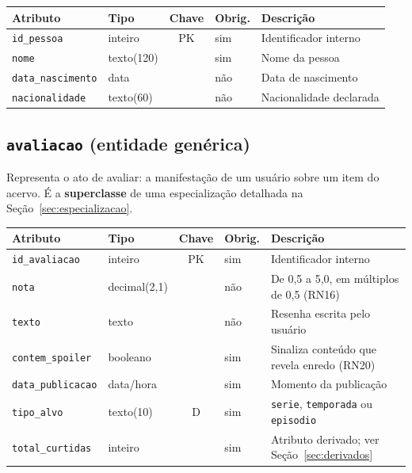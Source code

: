 \documentclass[a4paper,12pt,oneside,openany]{book}
\newcommand{\id}[1]{\texttt{#1}}
\begin{document}
\begin{table}[H]
\centering
\small
\begin{tabularx}{\textwidth}{@{}llclX@{}}
\toprule
\textbf{Atributo} & \textbf{Tipo} & \textbf{Chave} & \textbf{Obrig.} & \textbf{Descrição} \\
\midrule
\id{id\_pessoa} & inteiro & PK & sim & Identificador interno \\
\id{nome} & texto(120) & & sim & Nome da pessoa \\
\id{data\_nascimento} & data & & não & Data de nascimento \\
\id{nacionalidade} & texto(60) & & não & Nacionalidade declarada \\
\bottomrule
\end{tabularx}
\end{table}

\subsection{\id{avaliacao} (entidade genérica)}

Representa o ato de avaliar: a manifestação de um usuário sobre um item do acervo.
É a \textbf{superclasse} de uma especialização detalhada na
Seção~\ref{sec:especializacao}.

\begin{table}[H]
\centering
\small
\begin{tabularx}{\textwidth}{@{}llclX@{}}
\toprule
\textbf{Atributo} & \textbf{Tipo} & \textbf{Chave} & \textbf{Obrig.} & \textbf{Descrição} \\
\midrule
\id{id\_avaliacao} & inteiro & PK & sim & Identificador interno \\
\id{nota} & decimal(2,1) & & não & De 0,5 a 5,0, em múltiplos de 0,5 (RN16) \\
\id{texto} & texto & & não & Resenha escrita pelo usuário \\
\id{contem\_spoiler} & booleano & & sim & Sinaliza conteúdo que revela enredo (RN20) \\
\id{data\_publicacao} & data/hora & & sim & Momento da publicação \\
\id{tipo\_alvo} & texto(10) & D & sim & \id{serie}, \id{temporada} ou \id{episodio} \\
\id{total\_curtidas} & inteiro & & sim & Atributo derivado; ver Seção~\ref{sec:derivados} \\
\bottomrule
\end{tabularx}
\end{table}
\end{document}
